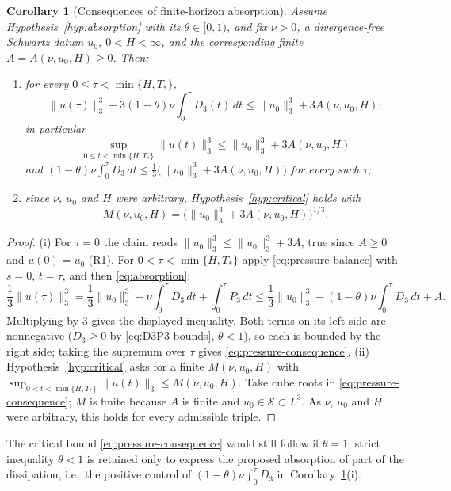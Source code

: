 \documentclass[11pt]{article}
\newtheorem{corollary}[theorem]{Corollary}
\theoremstyle{definition}
\theoremstyle{plain}
\newcommand{\norm}[1]{\lVert #1\rVert}
\begin{document}
\begin{corollary}[Consequences of finite-horizon absorption]
\label{cor:absorption-consequence}
Assume Hypothesis~\ref{hyp:absorption} with its $\theta\in[0,1)$, and fix
$\nu>0$, a divergence-free Schwartz datum $u_0$, $0<H<\infty$, and the
corresponding finite $A=A(\nu,u_0,H)\geq0$.  Then:
\begin{enumerate}
\item[(i)] for every $0\leq\tau<\min\{H,T_*\}$,
\[
 \norm{u(\tau)}_3^3+3(1-\theta)\nu\int_0^\tau D_3(t)\,dt
 \leq\norm{u_0}_3^3+3A(\nu,u_0,H);
\]
in particular
\begin{equation}\label{eq:pressure-consequence}
 \sup_{0\leq t<\min\{H,T_*\}}\norm{u(t)}_3^3
 \leq\norm{u_0}_3^3+3A(\nu,u_0,H)
\end{equation}
and $(1-\theta)\nu\int_0^\tau D_3\,dt\leq\frac13\bigl(\norm{u_0}_3^3+3A(\nu,u_0,H)\bigr)$
for every such $\tau$;
\item[(ii)] since $\nu$, $u_0$ and $H$ were arbitrary,
Hypothesis~\ref{hyp:critical} holds with
\[
 M(\nu,u_0,H)=\bigl(\norm{u_0}_3^3+3A(\nu,u_0,H)\bigr)^{1/3}.
\]
\end{enumerate}
\end{corollary}

\begin{proof}
(i) For $\tau=0$ the claim reads $\norm{u_0}_3^3\leq\norm{u_0}_3^3+3A$,
true since $A\geq0$ and $u(0)=u_0$ (R1).  For $0<\tau<\min\{H,T_*\}$ apply
\eqref{eq:pressure-balance} with $s=0$, $t=\tau$, and then
\eqref{eq:absorption}:
\[
 \frac13\norm{u(\tau)}_3^3
 =\frac13\norm{u_0}_3^3-\nu\int_0^\tau D_3\,dt+\int_0^\tau P_3\,dt
 \leq\frac13\norm{u_0}_3^3-(1-\theta)\nu\int_0^\tau D_3\,dt+A .
\]
Multiplying by $3$ gives the displayed inequality.  Both terms on its left
side are nonnegative ($D_3\geq0$ by \eqref{eq:D3P3-bounds}, $\theta<1$), so
each is bounded by the right side; taking the supremum over $\tau$ gives
\eqref{eq:pressure-consequence}.
(ii) Hypothesis~\ref{hyp:critical} asks for a finite
$M(\nu,u_0,H)$ with $\sup_{0<t<\min\{H,T_*\}}\norm{u(t)}_3\leq M(\nu,u_0,H)$.
Take cube roots in \eqref{eq:pressure-consequence}; $M$ is finite because
$A$ is finite and $u_0\in\mathcal S\subset L^3$.  As $\nu$, $u_0$ and $H$
were arbitrary, this holds for every admissible triple.
\end{proof}

The critical bound \eqref{eq:pressure-consequence} would still follow if
$\theta=1$; strict inequality $\theta<1$ is retained only to express the
proposed absorption of part of the dissipation, i.e.\ the positive control
of $(1-\theta)\nu\int_0^\tau D_3$ in Corollary~\ref{cor:absorption-consequence}(i).
\end{document}

